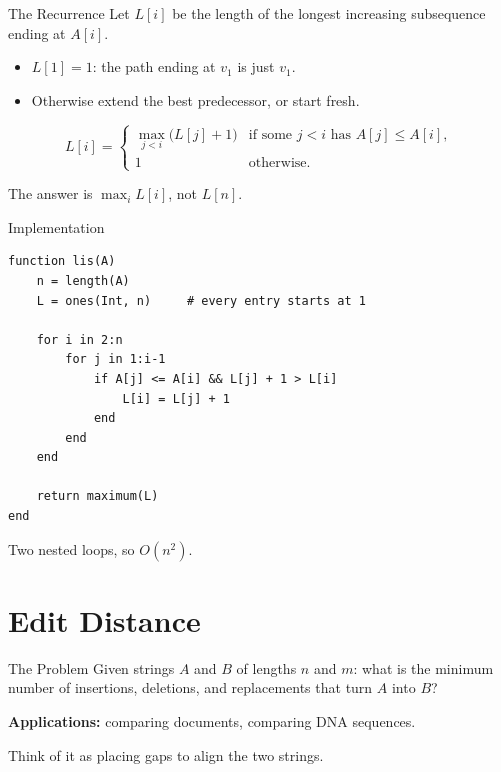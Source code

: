 \documentclass[10pt,aspectratio=169]{beamer}
\begin{document}
\begin{frame}{The Recurrence}
  Let $L[i]$ be the length of the longest increasing subsequence
  \alert{ending at} $A[i]$.

  \bigskip
  \begin{itemize}
    \item $L[1] = 1$: the path ending at $v_1$ is just $v_1$.
    \item Otherwise extend the best predecessor, or start fresh.
  \end{itemize}

  \bigskip
  \begin{alertblock}{}
    \[
      L[i] = \begin{cases}
        \max_{j < i} \big( L[j] + 1 \big)
          & \text{if some } j < i \text{ has } A[j] \le A[i], \\[0.4em]
        1 & \text{otherwise.}
      \end{cases}
    \]
  \end{alertblock}

  \bigskip
  \begin{center}
    The answer is $\max_i L[i]$, not $L[n]$.
  \end{center}
\end{frame}

\begin{frame}[fragile]{Implementation}
  \begin{lstlisting}
function lis(A)
    n = length(A)
    L = ones(Int, n)     # every entry starts at 1

    for i in 2:n
        for j in 1:i-1
            if A[j] <= A[i] && L[j] + 1 > L[i]
                L[i] = L[j] + 1
            end
        end
    end

    return maximum(L)
end
  \end{lstlisting}

  \bigskip
  \begin{center}
    Two nested loops, so $O(n^2)$.
  \end{center}
\end{frame}

\section{Edit Distance}

\begin{frame}{The Problem}
  Given strings $A$ and $B$ of lengths $n$ and $m$: what is the minimum number
  of \alert{insertions}, \alert{deletions}, and \alert{replacements} that turn
  $A$ into $B$?

  \bigskip
  \textbf{Applications:} comparing documents, comparing DNA sequences.

  \bigskip
  \begin{center}
    Think of it as placing \alert{gaps} to align the two strings.
  \end{center}
\end{frame}
\end{document}
